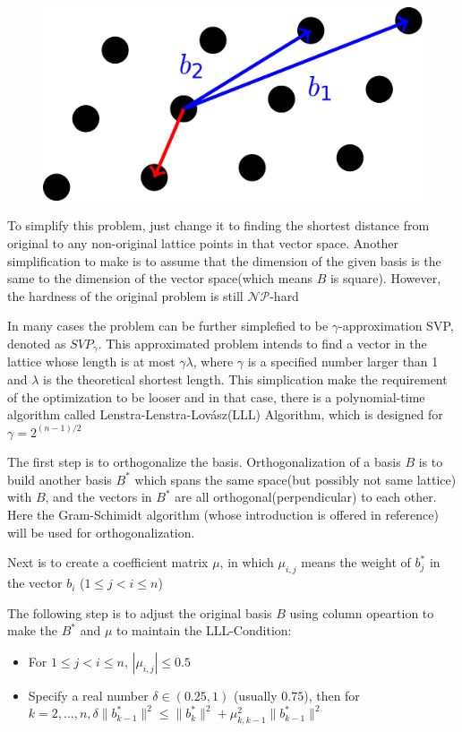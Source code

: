 \documentclass{article}
\begin{document}
\begin{figure}[h]
    \centering
    \includegraphics[scale=0.08]{problem55_1.png}
\end{figure}
To simplify this problem, just change it to finding the shortest distance from original to any non-original lattice points in that vector space. Another simplification to make is to assume that the dimension of the given basis is the same to the dimension of the vector space(which means $B$ is square). However, the hardness of the original problem is still $\mathcal{NP}$-hard

In many cases the problem can be further simplefied to be $\gamma$-approximation SVP, denoted as $SVP_{\gamma}$. This approximated problem intends to find a vector in the lattice whose length is at most $\gamma\lambda$, where $\gamma$ is a specified number larger than 1 and $\lambda$ is the theoretical shortest length. This simplication make the requirement of the optimization to be looser and in that case, there is a polynomial-time algorithm called  Lenstra-Lenstra-Lov\'asz(LLL) Algorithm, which is designed for $\gamma = 2^{(n-1)/2}$

The first step is to orthogonalize the basis. Orthogonalization of a basis $B$ is to build another basis $B^*$ which spans the same space(but possibly not same lattice) with $B$, and the vectors in $B^*$ are all orthogonal(perpendicular) to each other. Here the Gram-Schimidt algorithm (whose introduction is offered in reference) will be used for orthogonalization.

Next is to create a coefficient matrix $\mu$, in which $\mu_{i,j}$ means the weight of $b_j^*$ in the vector $b_i$ ($1\leq j<i\leq n$)

The following step is to adjust the original basis $B$ using column opeartion to make the $B^*$ and $\mu$ to maintain the LLL-Condition:

\begin{itemize}
    \item For $1\leq j<i\leq n$, $|\mu_{i,j}|\leq 0.5$
    \item Specify a real number $\delta\in(0.25,1)$ (usually $0.75$), then for $k=2,...,n,\delta \|b_{k-1}^*\|^2 \leq \|b_k^*\|^2+\mu_{k,k-1}^2\|b_{k-1}^*\|^2$
\end{itemize}
\end{document}
